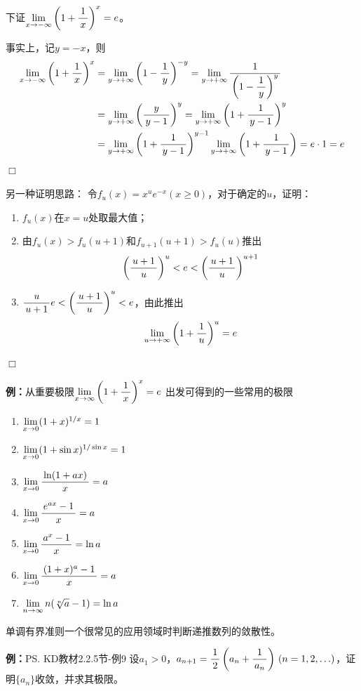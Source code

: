 下证$\limx{-\infty}\left(1+\df1x\right)^x=e$。

事实上，记$y=-x$，则
\begin{align*}
	\limx{-\infty}\left(1+\df1x\right)^x
	&=\lim\limits_{y\to+\infty}\left(1-\df1y\right)^{-y}
	=\lim\limits_{y\to+\infty}\df1{\left(1-\df1y\right)^{y}}\\
	&=\lim\limits_{y\to+\infty}\left(\df y{y-1}\right)^{y}
	=\lim\limits_{y\to+\infty}\left(1+\df1{y-1}\right)^{y}\\
	&=\lim\limits_{y\to+\infty}\left(1+\df1{y-1}\right)^{y-1}
	\lim\limits_{y\to+\infty}\left(1+\df1{y-1}\right)=e\cdot1=e
\end{align*}
\hfill $\Box$

\begin{shaded}
另一种证明思路：
令$f_u(x)=x^ue^{-x}(x\geq 0)$，对于确定的$u$，证明：
\begin{enumerate}[(1)]
  \setlength{\itemindent}{1cm}
  \item $f_u(x)$在$x=u$处取最大值；
  \item 由$f_u(x)>f_u(u+1)$和$f_{u+1}(u+1)>f_u(u)$推出
  $$\left(\df{u+1}u\right)^u<e<\left(\df{u+1}u\right)^{u+1}$$
  \item $\df u{u+1}e<\left(\df{u+1}u\right)^u<e$，由此推出
  $$\lim\limits_{u\to+\infty}\left(1+\df 1u\right)^u=e$$
\end{enumerate}
\hfill $\Box$
\end{shaded}

{\b{\bf 例：}从重要极限$\limx{\infty}\left(1+\df1x\right)^x=e$
出发可得到的一些常用的极限
\begin{enumerate}[(1)]
  \setlength{\itemindent}{1cm}
  \item $\limx{0}(1+x)^{1/x}=1$ 
  \item $\limx 0(1+\sin x)^{1/\sin x}=1$ 
  \item $\limx 0\df{\ln(1+ax)}{x}=a$
  \item $\limx 0\df{e^{ax}-1}{x}=a$ 
  \item $\limx 0\df{a^x-1}{x}=\ln a$ 
  \item $\limx 0\df{(1+x)^a-1}x=a$
  \item $\limn n(\sqrt[n]{a}-1)=\ln a$ 
\end{enumerate}}

单调有界准则一个很常见的应用领域时判断递推数列的敛散性。

{\bf 例：}\ps{KD教材2.2.5节-例9}
设$a_1>0$，$a_{n+1}=\df 12\left(a_n+\df 1{a_n}\right)\,
(n=1,2,\ldots)$，证明$\{a_n\}$收敛，并求其极限。

